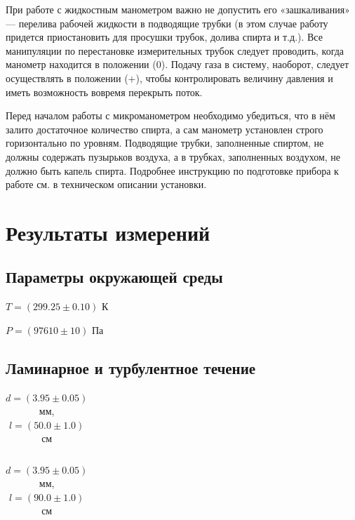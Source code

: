 \documentclass[a4paper,12pt]{article} %
\begin{document}
При работе с жидкостным манометром важно не допустить его «зашкаливания» — перелива рабочей жидкости в подводящие трубки (в этом случае
работу придется приостановить для просушки трубок, долива спирта и т.д.).
Все манипуляции по перестановке измерительных трубок следует проводить,
когда манометр находится в положении (0). Подачу газа в систему, наоборот,
следует осуществлять в положении (+), чтобы контролировать величину давления и иметь возможность вовремя перекрыть поток.

Перед началом работы с микроманометром необходимо убедиться, что в
нём залито достаточное количество спирта, а сам манометр установлен строго
горизонтально по уровням. Подводящие трубки, заполненные спиртом, не
должны содержать пузырьков воздуха, а в трубках, заполненных воздухом, не
должно быть капель спирта. Подробнее инструкцию по подготовке прибора к
работе см. в техническом описании установки.

\newpage

\section{Результаты измерений}

\subsection*{Параметры окружающей среды}

$T=(299.25 \pm 0.10)$ К

$P=(97610 \pm 10)$ Па

\subsection*{Ламинарное и турбулентное течение}

\begin{table}[ht!]
\caption{$d=(3.95 \pm 0.05)$ мм, $l=(50.0 \pm 1.0)$ см}
\begin{tabular}{ cc }


\end{tabular}
\end{table}

\begin{table}[ht!]
\caption{$d=(3.95 \pm 0.05)$ мм, $l=(90.0 \pm 1.0)$ см}
\begin{tabular}{ cc }


\end{tabular}
\end{table}
\end{document}
